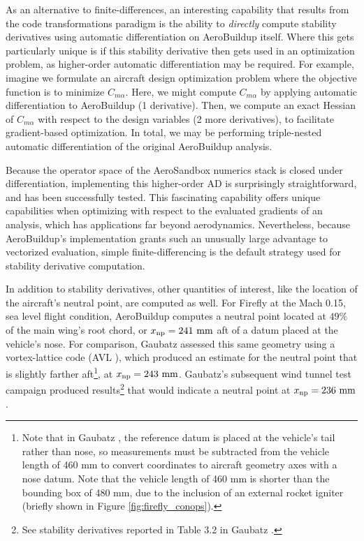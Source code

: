 As an alternative to finite-differences, an interesting capability that results from the code transformations paradigm is the ability to \emph{directly} compute stability derivatives using automatic differentiation on AeroBuildup itself. Where this gets particularly unique is if this stability derivative then gets used in an optimization problem, as higher-order automatic differentiation may be required. For example, imagine we formulate an aircraft design optimization problem where the objective function is to minimize $C_{m\alpha}$. Here, we might compute $C_{m\alpha}$ by applying automatic differentiation to AeroBuildup (1 derivative). Then, we compute an exact Hessian of $C_{m\alpha}$ with respect to the design variables (2 more derivatives), to facilitate gradient-based optimization. In total, we may be performing triple-nested automatic differentiation of the original AeroBuildup analysis.

Because the operator space of the AeroSandbox numerics stack is closed under differentiation, implementing this higher-order AD is surprisingly straightforward, and has been successfully tested. This fascinating capability offers unique capabilities when optimizing with respect to the evaluated gradients of an analysis, which has applications far beyond aerodynamics. Nevertheless, because AeroBuildup's implementation grants such an unusually large advantage to vectorized evaluation, simple finite-differencing is the default strategy used for stability derivative computation.

In addition to stability derivatives, other quantities of interest, like the location of the aircraft's neutral point, are computed as well. For Firefly at the Mach 0.15, sea level flight condition, AeroBuildup computes a neutral point located at $49\%$ of the main wing's root chord, or $x_{\rm np} = 241\ \rm mm$ aft of a datum placed at the vehicle's nose. For comparison, Gaubatz \cite{gaubatz_design_2024} assessed this same geometry using a vortex-lattice code (AVL \cite{avl}), which produced an estimate for the neutral point that is slightly farther aft\footnote{Note that in Gaubatz \cite{gaubatz_design_2024}, the reference datum is placed at the vehicle's tail rather than nose, so measurements must be subtracted from the vehicle length of 460 mm to convert coordinates to aircraft geometry axes with a nose datum. Note that the vehicle length of 460 mm is shorter than the bounding box of 480 mm, due to the inclusion of an external rocket igniter (briefly shown in Figure \ref{fig:firefly_conops}).}, at $x_{\rm np} = 243\ \rm mm$. Gaubatz's subsequent wind tunnel test campaign produced results\footnote{See stability derivatives reported in Table 3.2 in Gaubatz \cite{gaubatz_design_2024}.} that would indicate a neutral point at $x_{\rm np} = 236\ \rm mm$.

